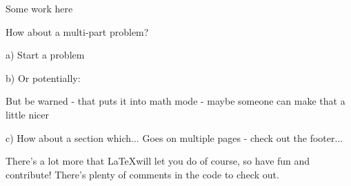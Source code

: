 \documentclass{article}
\begin{document}
\begin{spacing}{1.1}
\maketitle


\clearpage
\begin{homeworkProblem}
Some work here

\end{homeworkProblem}

\clearpage
\begin{homeworkProblem}
How about a multi-part problem?

\begin{homeworkSection}{a)}
Start a problem
\end{homeworkSection}

\begin{homeworkSection}{b)}
Or potentially:

But be warned - that puts it into math mode - maybe someone can make that a little nicer
\end{homeworkSection}

\begin{homeworkSection}{c)}
How about a section which...
\clearpage
Goes on multiple pages - check out the footer...

\end{homeworkSection}
\end{homeworkProblem}

\begin{homeworkProblem}
There's a lot more that \LaTeX will let you do of course, so have fun and contribute!  There's plenty of comments in the code to check out.
\end{homeworkProblem}
\end{spacing}
\end{document}
